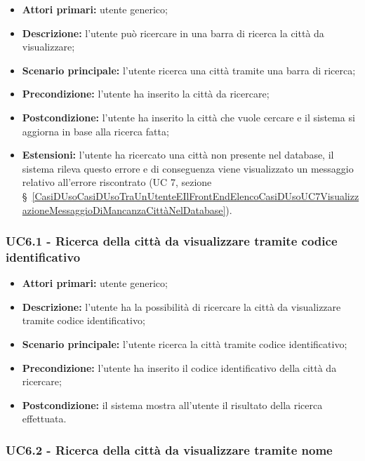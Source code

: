 \begin{itemize}
	\item \textbf{Attori primari:} utente generico;
	\item \textbf{Descrizione:} l’utente può ricercare in una barra di ricerca la città da visualizzare;
	\item \textbf{Scenario principale:} l’utente ricerca una città tramite una barra di ricerca;
	\item \textbf{Precondizione:} l’utente ha inserito la città da ricercare;
	\item \textbf{Postcondizione:} l’utente ha inserito la città che vuole cercare e il sistema si aggiorna in base alla ricerca fatta;
	\item \textbf{Estensioni:} l’utente ha ricercato una città non presente nel database, il sistema rileva questo errore e di conseguenza viene visualizzato un messaggio relativo all’errore riscontrato (UC 7, sezione \S~\ref{CasiDUsoCasiDUsoTraUnUtenteEIlFrontEndElencoCasiDUsoUC7VisualizzazioneMessaggioDiMancanzaCittàNelDatabase}).
\end{itemize}

\subsubsection{UC6.1 - Ricerca della città da visualizzare tramite codice identificativo}\label{CasiDUsoCasiDUsoTraUnUtenteEIlFrontEndElencoCasiDUsoUC61RicercaDellaCittàDaVisualizzareTramiteCodiceIdentificativo}

\begin{itemize}
	\item \textbf{Attori primari:} utente generico;
	\item \textbf{Descrizione:} l’utente ha la possibilità di ricercare la città da visualizzare tramite codice identificativo;
	\item \textbf{Scenario principale:} l’utente ricerca la città tramite codice identificativo;
	\item \textbf{Precondizione:} l’utente ha inserito il codice identificativo della città da ricercare;
	\item \textbf{Postcondizione:} il sistema mostra all’utente il risultato della ricerca effettuata.
\end{itemize}

\subsubsection{UC6.2 - Ricerca della città da visualizzare tramite nome}\label{CasiDUsoCasiDUsoTraUnUtenteEIlFrontEndElencoCasiDUsoUC52RicercaDellaCittàDaVisualizzareTramiteNome}

